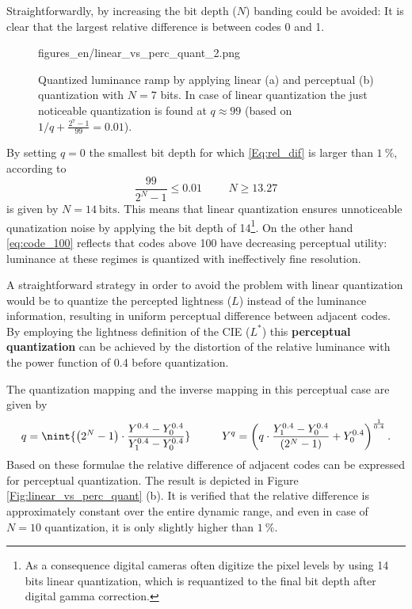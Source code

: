 Straightforwardly, by increasing the bit depth ($N$) banding could be avoided:
It is clear that the largest relative difference is between codes 0 and 1.
%
\begin{figure}[]
	\centering
	\begin{overpic}[width = 0.8\columnwidth ]{figures_en/linear_vs_perc_quant_2.png}
	\end{overpic}
	\caption{Quantized luminance ramp by applying linear (a) and perceptual (b) quantization with $N=7$ bits.
	In case of linear quantization the just noticeable quantization is found at $q \approx 99$ (based on $1 / q + \frac{2^7 - 1}{99} = 0.01$).}
	\label{Fig:linear_vs_perc_quant_2}
\end{figure}
%
By setting $q = 0$ the smallest bit depth for which \eqref{Eq:rel_dif} is larger than $1~\%$, according to
\begin{equation}
\frac{99}{2^N - 1} \leq 0.01 \hspace{1cm} N \geq 13.27 
\end{equation}
is given by $N = 14~\mathrm{bits}$.
This means that linear quantization ensures unnoticeable qunatization noise by applying the bit depth of 14\footnote{
As a consequence digital cameras often digitize the pixel levels by using 14 bits linear quantization, which is requantized to the final bit depth after digital gamma correction.}.
On the other hand \eqref{eq:code_100} reflects that codes above 100 have decreasing perceptual utility: luminance at these regimes is quantized with ineffectively fine resolution.

\vspace{3mm}
A straightforward strategy in order to avoid the problem with linear quantization would be to quantize the percepted lightness ($L$) instead of the luminance information, resulting in uniform perceptual difference between adjacent codes.
By employing the lightness definition of the CIE ($L^*$) this \textbf{perceptual quantization} can be achieved by the distortion of the relative luminance with the power function of 0.4 before quantization.

The quantization mapping and the inverse mapping in this perceptual case are given by
\begin{equation}
q =  \nint{ \left( 2^N - 1 \right) \cdot  \frac{Y^{0.4} - Y_0^{0.4} }{Y_1^{0.4} - Y_0^{0.4}} }
\hspace{1cm}
Y^q = \left( q \cdot \frac{Y_1^{0.4} - Y_0^{0.4}}{\left( 2^N - 1 \right) } + Y_0^{0.4} \right)^{\frac{1}{0.4}} .
\end{equation}
Based on these formulae the relative difference of adjacent codes can be expressed for perceptual quantization.
The result is depicted in Figure \ref{Fig:linear_vs_perc_quant} (b).
It is verified that the relative difference is approximately constant over the entire dynamic range, and even in case of $N = 10$ quantization, it is only slightly higher than $1~\%$.

